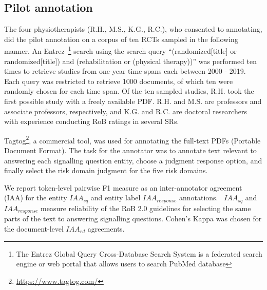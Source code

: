 \documentclass{IOS-Book-Article}
\begin{document}
\subsection{Pilot annotation}
\label{subsec:annotation}
%
The four physiotherapists (R.H., M.S., K.G., R.C.), who consented to annotating, did the pilot annotation on a corpus of ten RCTs sampled in the following manner.
An Entrez~\footnote{The Entrez Global Query Cross-Database Search System is a federated search engine or web portal that allows users to search PubMed database} search using the search query ``{\selectfont (randomized[title] or randomized[title]) and (rehabilitation or (physical therapy))}'' was performed ten times to retrieve studies from one-year time-spans each between 2000 - 2019.
Each query was restricted to retrieve 1000 documents, of which ten were randomly chosen for each time span.
Of the ten sampled studies, R.H. took the first possible study with a freely available PDF.
R.H. and M.S. are professors and associate professors, respectively, and K.G. and R.C. are doctoral researchers with experience conducting RoB ratings in several SRs.


Tagtog\footnote{\url{https://www.tagtog.com/}}, a commercial tool, was used for annotating the full-text PDFs (Portable Document Format).
The task for the annotator was to annotate text relevant to answering each signalling question entity, choose a judgment response option, and finally select the risk domain judgment for the five risk domains.

We report token-level pairwise F1 measure as an inter-annotator agreement (IAA) for the entity $IAA_{sq}$ and entity label $IAA_{response}$
annotations.~\cite{brandsen2020creating,deleger2012building}
$IAA_{sq}$ and $IAA_{response}$ measure reliability of the RoB 2.0 guidelines for selecting the same parts of the text to answering signalling questions.
Cohen's Kappa was chosen for the document-level $IAA_{rd}$ agreements.~\cite{mchugh2012interrater}
%
%
%
\end{document}

